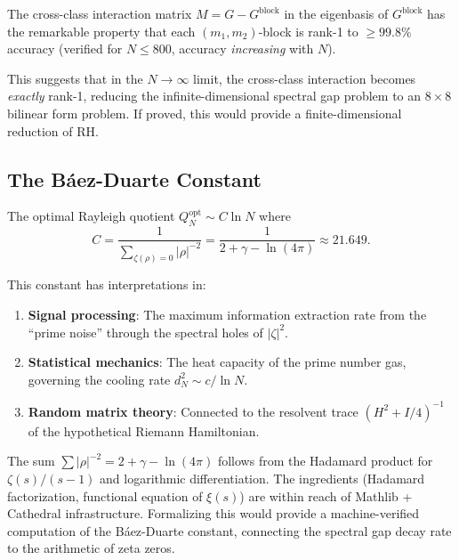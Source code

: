 \documentclass[11pt,a4paper]{article}
\begin{document}
\begin{direction}
The cross-class interaction matrix $M = G - G^{\mathrm{block}}$ in the
eigenbasis of $G^{\mathrm{block}}$ has the remarkable property that each
$(m_1, m_2)$-block is rank-1 to $\ge 99.8\%$ accuracy (verified for
$N \le 800$, accuracy \emph{increasing} with $N$).

This suggests that in the $N \to \infty$ limit, the cross-class
interaction becomes \emph{exactly} rank-1, reducing the infinite-dimensional
spectral gap problem to an $8 \times 8$ bilinear form problem. If proved,
this would provide a finite-dimensional reduction of RH.
\end{direction}

\subsection{The B\'aez-Duarte Constant}

The optimal Rayleigh quotient $Q_N^{\mathrm{opt}} \sim C \ln N$ where
\[
  C = \frac{1}{\sum_{\zeta(\rho)=0} |\rho|^{-2}}
  = \frac{1}{2 + \gamma - \ln(4\pi)}
  \approx 21.649.
\]

This constant has interpretations in:
\begin{enumerate}
  \item \textbf{Signal processing}: The maximum information extraction
    rate from the ``prime noise'' through the spectral holes of $|\zeta|^2$.
  \item \textbf{Statistical mechanics}: The heat capacity of the prime
    number gas, governing the cooling rate $d_N^2 \sim c/\ln N$.
  \item \textbf{Random matrix theory}: Connected to the resolvent trace
    $(H^2 + I/4)^{-1}$ of the hypothetical Riemann Hamiltonian.
\end{enumerate}

\begin{direction}
The sum $\sum |\rho|^{-2} = 2 + \gamma - \ln(4\pi)$ follows from the
Hadamard product for $\zeta(s)/(s-1)$ and logarithmic differentiation.
The ingredients (Hadamard factorization, functional equation of $\xi(s)$)
are within reach of Mathlib + Cathedral infrastructure. Formalizing this
would provide a machine-verified computation of the B\'aez-Duarte
constant, connecting the spectral gap decay rate to the arithmetic of
zeta zeros.
\end{direction}

\end{document}
